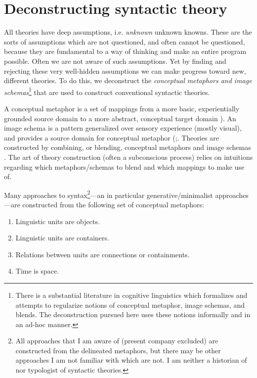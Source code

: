 \chapter{Deconstructing syntactic theory}

All theories have deep assumptions, i.e. \textit{unknown} unknown knowns. These are the sorts of assumptions which are not questioned, and often cannot be questioned, because they are fundamental to a way of thinking and make an entire program possible. Often we are not aware of such assumptions. Yet by finding and rejecting these very well-hidden assumptions we can make progress toward new, different theories. To do this, we deconstruct the \textit{conceptual metaphors and image schemas}\footnote{There is a substantial literature in cognitive linguistics which formalizes and attempts to regularize notions of conceptual metaphor, image schemas, and blends. The deconstruction pursued here uses these notions informally and in an ad-hoc manner.} that are used to construct conventional syntactic theories. 

  A conceptual metaphor is a set of mappings from a more basic, experientially grounded source domain to a more abstract, conceptual target domain \citep{Lakoff1990,Lakoff1993,Lakoff2008,LakoffJohnson1980a,LakoffJohnson1980b,LakoffJohnson1999,LakoffJohnson200}). An image schema is a pattern generalized over sensory experience (mostly visual), and provides a source domain for conceptual metaphor (\citealt{ClausnerCroft1999,FauconnierTurner1996,FauconnierTurner2008,GibbsColston1995,GradyEtAl1999,Langacker2002,Oakley2007,Talmy1983,Talmy1988};. Theories are constructed by combining, or blending, conceptual metaphors and image schemas \citep{FauconnierTurner1996,FauconnierTurner2008,GradyEtAl1999,LakoffNúñez2000}. The art of theory construction (often a subconscious process) relies on intuitions regarding which metaphors/schemas to blend and which mappings to make use of.

  Many approaches to syntax\footnote{All approaches that I am aware of (present company excluded) are constructed from the delineated metaphors, but there may be other approaches I am not familiar with which are not. I am neither a historian of nor typologist of syntactic theories.}—an in particular generative/minimalist approaches—are constructed from the following set of conceptual metaphors: 

\begin{enumerate}
\item Linguistic units are objects.
\item Linguistic units are containers.
\item Relations between units are connections or containments.
\item Time is space.
\end{enumerate}

